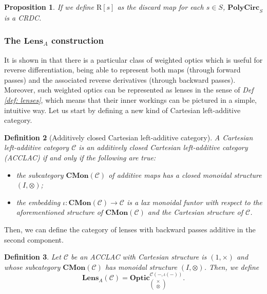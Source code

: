 \documentclass[12pt,a4paper,openright,twoside]{report}
\theoremstyle{plain}
\newtheorem{proposition}{Proposition}
\newtheorem{definition}[proposition]{Definition}
\theoremstyle{definition}
\begin{document}
\begin{proposition}
  If we define $\mathrm{R}[s]$ as the discard map for each $s \in S$, $\mathbf{PolyCirc}_S$ is a CRDC.
\end{proposition}


\subsubsection{The $\mathbf{Lens}_A$ construction}


It is shown in \cite{gavranovic2024fundamental} that there is a particular class of weighted optics which is useful for reverse differentiation, being able to represent both maps (through forward passes) and the associated reverse derivatives (through backward passes). Moreover, such weighted optics can be represented as lenses in the sense of \textit{Def \ref{def: lenses}}, which means that their inner workings can be pictured in a simple, intuitive way.
Let us start by defining a new kind of Cartesian left-additive category.


\begin{definition}[Additively closed Cartesian left-additive category]
  A Cartesian left-additive category $\mathcal{C}$ is an additively closed Cartesian left-additive category (ACCLAC) if and only if the following are true:
  \begin{itemize}
    \item the subcategory $\mathbf{CMon}(\mathcal{C})$ of additive maps has a closed monoidal structure $(I, \otimes)$;
    \item the embedding $\iota: \mathbf{CMon}(\mathcal{C}) \to \mathcal{C}$ is a lax monoidal funtor with respect to the aforementioned structure of $\mathbf{CMon}(\mathcal{C})$ and the Cartesian structure of $\mathcal{C}$.
  \end{itemize}
\end{definition}


Then, we can define the category of lenses with backward passes additive in the second component.

\begin{definition}
  Let $\mathcal{C}$ be an ACCLAC with Cartesian structure is $(1, \times)$ and whose subcategory $\mathbf{CMon}(\mathcal{C})$ has monoidal structure $(I, \otimes)$. Then, we define
  \[\mathbf{Lens}_A(\mathcal{C}) = \mathbf{Optic}_{\left(\begin{smallmatrix}\times \\ \otimes\end{smallmatrix}\right)}^{\mathcal{C}(-,\iota(-))}.\]
\end{definition}
\end{document}
